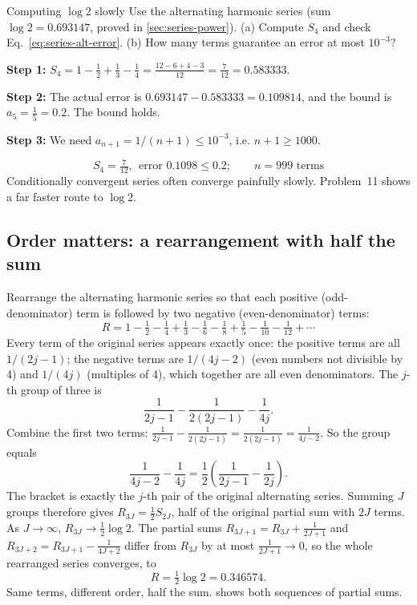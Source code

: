 \begin{sample}{Computing $\log 2$ slowly}
Use the alternating harmonic series (sum $\log2=0.693147$, proved in \cref{sec:series-power}). (a) Compute $S_4$ and check Eq.~\eqref{eq:series-alt-error}. (b) How many terms guarantee an error at most $10^{-3}$?

\textbf{Step 1:} $S_4=1-\tfrac12+\tfrac13-\tfrac14=\tfrac{12-6+4-3}{12}=\tfrac7{12}=0.583333$.

\textbf{Step 2:} The actual error is $0.693147-0.583333=0.109814$, and the bound is $a_5=\tfrac15=0.2$. The bound holds.

\textbf{Step 3:} We need $a_{n+1}=1/(n+1)\le10^{-3}$, i.e. $n+1\ge1000$.

\[\boxed{S_4=\tfrac7{12},\ \ \text{error }0.1098\le0.2;\qquad n=999\text{ terms}}\]
Conditionally convergent series often converge painfully slowly. Problem~11 shows a far faster route to $\log2$.
\end{sample}

\subsection{Order matters: a rearrangement with half the sum}

Rearrange the alternating harmonic series so that each positive (odd-denominator) term is followed by two negative (even-denominator) terms:
\[
R=1-\tfrac12-\tfrac14+\tfrac13-\tfrac16-\tfrac18+\tfrac15-\tfrac1{10}-\tfrac1{12}+\cdots
\]
Every term of the original series appears exactly once: the positive terms are all $1/(2j-1)$; the negative terms are $1/(4j-2)$ (even numbers not divisible by 4) and $1/(4j)$ (multiples of 4), which together are all even denominators. The $j$-th group of three is
\[
\frac1{2j-1}-\frac1{2(2j-1)}-\frac1{4j}.
\]
Combine the first two terms: $\frac1{2j-1}-\frac1{2(2j-1)}=\frac1{2(2j-1)}=\frac1{4j-2}$. So the group equals
\[
\frac1{4j-2}-\frac1{4j}=\frac12\left(\frac1{2j-1}-\frac1{2j}\right).
\]
The bracket is exactly the $j$-th pair of the original alternating series. Summing $J$ groups therefore gives $R_{3J}=\tfrac12S_{2J}$, half of the original partial sum with $2J$ terms. As $J\to\infty$, $R_{3J}\to\tfrac12\log2$. The partial sums $R_{3J+1}=R_{3J}+\frac1{2J+1}$ and $R_{3J+2}=R_{3J+1}-\frac1{4J+2}$ differ from $R_{3J}$ by at most $\frac1{2J+1}\to0$, so the whole rearranged series converges, to
\[
R=\tfrac12\log2=0.346574 .
\]
Same terms, different order, half the sum.  shows both sequences of partial sums.

